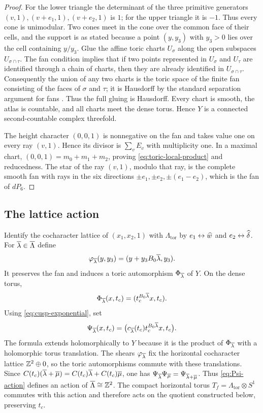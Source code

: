 \begin{proof}
For the lower triangle the determinant of the three primitive generators
$(v,1),(v+e_1,1),(v+e_2,1)$ is $1$; for the upper triangle it is $-1$.
Thus every cone is unimodular.  Two cones meet in the cone over the common
face of their cells, and the support is as stated because a point
$(y,y_3)$ with $y_3>0$ lies over the cell containing $y/y_3$.
Glue the affine toric charts $U_\sigma$ along the open subspaces
$U_{\sigma\cap\tau}$.  The fan condition implies that if two points
represented in $U_\sigma$ and $U_\tau$ are identified through a chain of
charts, then they are already identified in $U_{\sigma\cap\tau}$.
Consequently the union of any two charts is the toric space of the finite
fan consisting of the faces of $\sigma$ and $\tau$; it is Hausdorff by
the standard separation argument for fans \cite[Secs.~1.4,3.1]{Fulton}.
Thus the full gluing is Hausdorff.  Every chart is smooth, the atlas is
countable, and all charts meet the dense torus.  Hence $Y$ is a connected
second-countable complex threefold.

The height character $(0,0,1)$ is nonnegative on the fan and takes value
one on every ray $(v,1)$.  Hence its divisor is
$\sum_vE_v$ with multiplicity one.  In a maximal chart,
$(0,0,1)=m_0+m_1+m_2$, proving
\eqref{eq:toric-local-product} and reducedness.  The star of the ray
$(v,1)$, modulo that ray, is the complete smooth fan with rays in the six
directions
$\pm e_1,\pm e_2,\pm(e_1-e_2)$, which is the fan of $dP_6$.
\end{proof}

\subsection{The lattice action}
Identify the cocharacter lattice of $(x_1,x_2,1)$ with
$\Lambda_{\mathrm{tor}}$ by $e_1\leftrightarrow\widehat w$ and
$e_2\leftrightarrow\widehat\delta$.  For
$\overline\lambda\in\overline\Lambda$ define
\[
 \varphi_{\overline\lambda}(y,y_3)
 =(y+y_3B_0\overline\lambda,y_3).
\]
It preserves the fan and induces a toric automorphism $\Phi_{\overline\lambda}$
of $Y$.  On the dense torus,
\[
 \Phi_{\overline\lambda}(x,t_c)
 =(t_c^{B_0\overline\lambda}x,t_c).
\]
Using \eqref{eq:cusp-exponential}, set
\begin{equation}\label{eq:Psi-action}
 \Psi_{\overline\lambda}(x,t_c)
 =\bigl(c_{\overline\lambda}(t_c)t_c^{B_0\overline\lambda}x,t_c\bigr).
\end{equation}
The formula extends holomorphically to $Y$ because it is the product of
$\Phi_{\overline\lambda}$ with a holomorphic torus translation.  The shears
$\varphi_{\overline\lambda}$ fix the horizontal cocharacter lattice
$\mathbb Z^2\oplus0$, so the toric automorphisms commute with these translations.
Since $C(t_c)(\overline\lambda+\overline\mu)=C(t_c)\overline\lambda+C(t_c)\overline\mu$, one has
$\Psi_{\overline\lambda}\Psi_{\overline\mu}=\Psi_{\overline\lambda+\overline\mu}$.  Thus
\eqref{eq:Psi-action} defines an action of $\overline\Lambda\cong\mathbb Z^2$.
The compact horizontal torus
$T_f=\Lambda_{\mathrm{tor}}\otimes S^1$ commutes with this action and
therefore acts on the quotient constructed below, preserving $t_c$.

